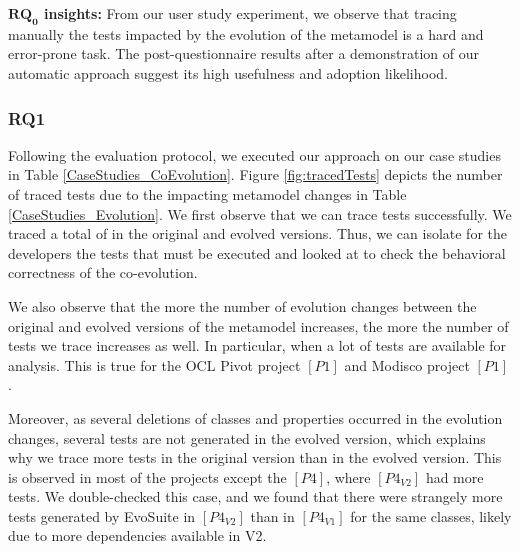 {\begin{tcolorbox}[boxsep=-2pt]
\textbf{$\boldsymbol{RQ_0}$ insights:}
 From our user study experiment, we observe that tracing manually the tests impacted by the evolution of the metamodel is a hard and error-prone task. The post-questionnaire results after a demonstration of our automatic approach suggest its high usefulness and adoption likelihood.
\end{tcolorbox}

}

\subsubsection{RQ1}

Following the evaluation protocol, we executed our approach on our case studies in Table \ref{CaseStudies_CoEvolution}. Figure \ref{fig:tracedTests} depicts the number of traced tests due to the impacting metamodel changes in Table \ref{CaseStudies_Evolution}. We first observe that we can trace tests successfully. We traced a total of  in the original and evolved versions. Thus, we can isolate for the developers the tests that must be executed and looked at to check the behavioral correctness of the co-evolution. 

We also observe that the more the number of evolution changes between the original and evolved versions of the metamodel increases,  the more the number of tests we trace increases as well. In particular, when a lot of tests are available for analysis. This is true for the OCL Pivot project $[P1]$ and Modisco project $[P1]$.  

Moreover, as several deletions of classes and properties occurred in the evolution changes, several tests are not generated in the evolved version, which explains why we trace more tests in the original version than in the evolved version. This is observed in most of the projects except the $[P4]$, where $[P4_{V2}]$ had more tests. We double-checked this case, and we found that there were strangely more tests generated by EvoSuite in $[P4_{V2}]$ than in $[P4_{V1}]$ for the same classes, likely due to more dependencies available in V2. 


